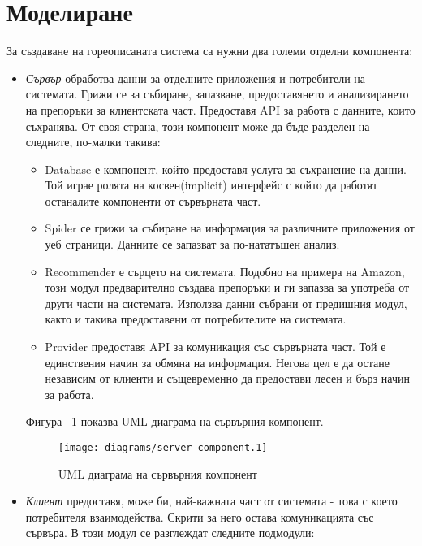 \section{Моделиране}
	
	За създаване на гореописаната система са нужни два големи отделни компонента:
	
	\begin{itemize}
		\item \emph{Сървър} обработва данни за отделните приложения и потребители на системата. Грижи се за събиране, запазване, предоставянето
		и анализирането на препоръки за клиентската част. Предоставя \ac{API} за работа с данните, които съхранява. От своя страна, този компонент
		може да бъде разделен на следните, по-малки такива:
		
		\begin{itemize}
			\item Database е компонент, който предоставя услуга за съхранение на данни. Той играе ролята на косвен(implicit) интерфейс с който да работят останалите компоненти от сървърната част.
			\item Spider се грижи за събиране на информация за различните приложения от уеб страници. Данните се запазват за по-нататъшен анализ.
			\item Recommender е сърцето на системата. Подобно на примера на Amazon, този модул предварително създава препоръки и ги запазва за употреба
			от други части на системата. Използва данни събрани от предишния модул, както и такива предоставени от потребителите на системата.
			\item Provider предоставя \ac{API} за комуникация със сървърната част. Той е единствения начин за обмяна на информация. Негова цел е да остане независим от клиенти и същевременно да предостави лесен и бърз начин за работа.
		\end{itemize}
		
		Фигура ~\ref{figure:server-component} показва UML диаграма на сървърния компонент.
		
		\begin{figure}[htbp]
			\centering	
 			\texttt{[image: diagrams/server-component.1]}
			\caption{UML диаграма на сървърния компонент}
			\label{figure:server-component}
		\end{figure}
		
		
		\item \emph{Клиент} предоставя, може би, най-важната част от системата - това с което потребителя взаимодейства. Скрити за него остава комуникацията със сървъра. В този модул се разглеждат следните подмодули:
		

\end{itemize}
